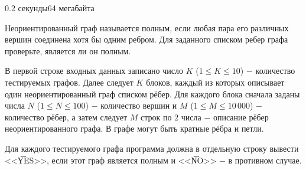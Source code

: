 \begin{problem}{}{}{}{0.2 секунды}{64 мегабайта}

Неориентированный граф называется полным, если любая пара его различных вершин соединена хотя бы одним ребром. 
Для заданного списком ребер графа проверьте, является ли он полным.

\InputFile
В первой строке входных данных записано число $K$ ($1 \le K \le 10$) $-$ количество тестируемых графов. 
Далее следует $K$ блоков, каждый из которых описывает один неориентированный граф списком рёбер. 
Для каждого блока сначала заданы числа $N$ ($1 \le N \le 100$) $-$ количество вершин и $M$ ($1 \le M \le 10\,000$) $-$
количество рёбер, а затем следует $M$ строк по $2$ числа $-$ описание рёбер неориентированного графа. В графе могут быть кратные рёбра
и петли.

\OutputFile
Для каждого тестируемого графа программа должна в отдельную строку вывести <<{\t{YES}}>>, если этот граф
является полным и <<{\t{NO}}>> $-$ в противном случае.

\Example

\begin{example}
%
\end{example}

\end{problem}

